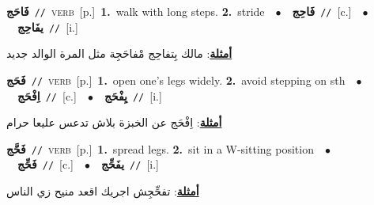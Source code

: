 \documentclass[10pt,a4paper,twoside]{article} %
\begin{document}
\begin{multicols}{2}
{\setlength\topsep{0pt}\textbf{\foreignlanguage{arabic}{فَاحَج}}\ {\color{gray}\texttt{//}\color{black}}\ \textsc{verb}\ [p.]\ \textbf{1.}~walk with long steps.  \textbf{2.}~stride\ \ $\bullet$\ \ \setlength\topsep{0pt}\textbf{\foreignlanguage{arabic}{فَاحِج}}\ {\color{gray}\texttt{//}\color{black}}\ [c.]\ \ $\bullet$\ \ \setlength\topsep{0pt}\textbf{\foreignlanguage{arabic}{يفَاحِج}}\ {\color{gray}\texttt{//}\color{black}}\ [i.]\  \begin{flushright}\color{gray}\foreignlanguage{arabic}{\textbf{\underline{\foreignlanguage{arabic}{أمثلة}}}: مالك بِتفاحِج مْفاحَجِة مثل المرة الوالد جديد}\end{flushright}\color{black}} \vspace{2mm}

{\setlength\topsep{0pt}\textbf{\foreignlanguage{arabic}{فَحَج}}\ {\color{gray}\texttt{//}\color{black}}\ \textsc{verb}\ [p.]\ \textbf{1.}~open one's legs widely.  \textbf{2.}~avoid stepping on sth\ \ $\bullet$\ \ \setlength\topsep{0pt}\textbf{\foreignlanguage{arabic}{اِفْحَج}}\ {\color{gray}\texttt{//}\color{black}}\ [c.]\ \ $\bullet$\ \ \setlength\topsep{0pt}\textbf{\foreignlanguage{arabic}{يِفْحَج}}\ {\color{gray}\texttt{//}\color{black}}\ [i.]\  \begin{flushright}\color{gray}\foreignlanguage{arabic}{\textbf{\underline{\foreignlanguage{arabic}{أمثلة}}}: اِفْحَج عن الخبزة بلاش تدعس عليعا حرام}\end{flushright}\color{black}} \vspace{2mm}

{\setlength\topsep{0pt}\textbf{\foreignlanguage{arabic}{فَحَّج}}\ {\color{gray}\texttt{//}\color{black}}\ \textsc{verb}\ [p.]\ \textbf{1.}~spread legs.  \textbf{2.}~sit in a W-sitting position\ \ $\bullet$\ \ \setlength\topsep{0pt}\textbf{\foreignlanguage{arabic}{فَحِّج}}\ {\color{gray}\texttt{//}\color{black}}\ [c.]\ \ $\bullet$\ \ \setlength\topsep{0pt}\textbf{\foreignlanguage{arabic}{يفَحِّج}}\ {\color{gray}\texttt{//}\color{black}}\ [i.]\  \begin{flushright}\color{gray}\foreignlanguage{arabic}{\textbf{\underline{\foreignlanguage{arabic}{أمثلة}}}: تفحِّجِش اجريك اقعد منيح زي الناس}\end{flushright}\color{black}} \vspace{2mm}


\end{multicols}
\end{document}
